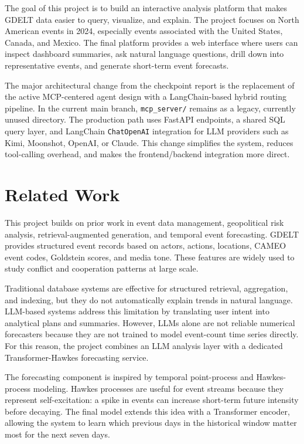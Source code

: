 \documentclass[11pt]{article}
\begin{document}
The goal of this project is to build an interactive analysis platform that makes GDELT data easier to query, visualize, and explain. The project focuses on North American events in 2024, especially events associated with the United States, Canada, and Mexico. The final platform provides a web interface where users can inspect dashboard summaries, ask natural language questions, drill down into representative events, and generate short-term event forecasts.

The major architectural change from the checkpoint report is the replacement of the active MCP-centered agent design with a LangChain-based hybrid routing pipeline. In the current main branch, \texttt{mcp\_server/} remains as a legacy, currently unused directory. The production path uses FastAPI endpoints, a shared SQL query layer, and LangChain \texttt{ChatOpenAI} integration for LLM providers such as Kimi, Moonshot, OpenAI, or Claude. This change simplifies the system, reduces tool-calling overhead, and makes the frontend/backend integration more direct.

\section{Related Work}

This project builds on prior work in event data management, geopolitical risk analysis, retrieval-augmented generation, and temporal event forecasting. GDELT provides structured event records based on actors, actions, locations, CAMEO event codes, Goldstein scores, and media tone. These features are widely used to study conflict and cooperation patterns at large scale.

Traditional database systems are effective for structured retrieval, aggregation, and indexing, but they do not automatically explain trends in natural language. LLM-based systems address this limitation by translating user intent into analytical plans and summaries. However, LLMs alone are not reliable numerical forecasters because they are not trained to model event-count time series directly. For this reason, the project combines an LLM analysis layer with a dedicated Transformer-Hawkes forecasting service.

The forecasting component is inspired by temporal point-process and Hawkes-process modeling. Hawkes processes are useful for event streams because they represent self-excitation: a spike in events can increase short-term future intensity before decaying. The final model extends this idea with a Transformer encoder, allowing the system to learn which previous days in the historical window matter most for the next seven days.
\end{document}
